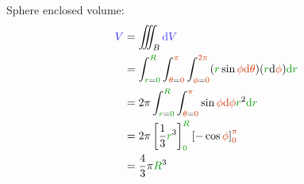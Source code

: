 Sphere enclosed volume:
\begin{align*}
\vol{V}
&= \iiint_B \vol{\d V}
\\
&= \int_{\dist{r}=\dist{0}}^{\dist{R}}
  \int_{\angle{\theta}=\angle{0}}^{\angle{\pi}}
  \int_{\angle{\phi}=\angle{0}}^{\angle{2\pi}}
  (\dist{r} \sin \angle{\phi} \angle{\d \theta}) (\dist{r} \d \angle{\phi}) \dist{\d r}
\\
&= 2 \pi
  \int_{\dist{r}=\dist{0}}^{\dist{R}}
  \int_{\angle{\theta}=\angle{0}}^{\angle{\pi}} \sin \angle{\phi} \angle{\d \phi} \dist{r}^2 \dist{\d r}
\\
&= 2 \pi
  \left[\frac 1 3 \dist{r}^3\right]_{\dist{0}}^{\dist{R}}
  \left[- \cos \angle{\phi}\right]_{\angle{0}}^{\angle{\pi}}
\\
&= \frac 4 3 \pi \dist{R}^3
\end{align*}
